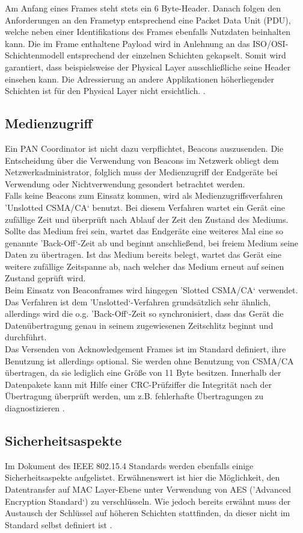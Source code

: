 Am Anfang eines Frames steht stets ein 6 Byte-Header. Danach folgen den Anforderungen an den Frametyp entsprechend eine Packet Data Unit (PDU), welche neben einer Identifikations des Frames ebenfalls Nutzdaten beinhalten kann. Die im Frame enthaltene Payload wird in Anlehnung an das ISO/OSI-Schichtenmodell entsprechend der einzelnen Schichten gekapselt. Somit wird garantiert, dass beispielsweise der Physical Layer ausschließliche seine Header einsehen kann. Die Adressierung an andere Applikationen höherliegender Schichten ist für den Physical Layer nicht ersichtlich.
\cite{d:hesse} \cite{d:ieee}.

\subsection{Medienzugriff}\label{ss:Medienzugriff}

Ein PAN Coordinator ist nicht dazu verpflichtet, Beacons auszusenden. Die Entscheidung über die Verwendung von Beacons im Netzwerk obliegt dem Netzwerkadministrator, folglich muss der Medienzugriff der Endgeräte bei Verwendung oder Nichtverwendung gesondert betrachtet werden. \\
Falls keine Beacons zum Einsatz kommen, wird als Medienzugriffsverfahren 'Unslotted CSMA/CA‘ benutzt. Bei diesem Verfahren wartet ein Gerät eine zufällige Zeit und überprüft nach Ablauf der Zeit den Zustand des Mediums. Sollte das Medium frei sein, wartet das Endgeräte eine weiteres Mal eine so genannte 'Back-Off‘-Zeit ab und beginnt anschließend, bei freiem Medium seine Daten zu übertragen. Ist das Medium bereits belegt, wartet das Gerät eine weitere zufällige Zeitspanne ab, nach welcher das Medium erneut auf seinen Zustand geprüft wird.\\
Beim Einsatz von Beaconframes wird hingegen 'Slotted CSMA/CA‘ verwendet. Das Verfahren ist dem 'Unslotted‘-Verfahren grundsätzlich sehr ähnlich, allerdings wird die o.g. 'Back-Off‘-Zeit so synchronisiert, dass das Gerät die Datenübertragung genau in seinem zugewiesenen Zeitschlitz beginnt und durchführt. \\
Das Versenden von Acknowledgement Frames ist im Standard definiert, ihre Benutzung ist allerdings optional. Sie werden ohne Benutzung von CSMA/CA übertragen, da sie lediglich eine Größe von 11 Byte besitzen. Innerhalb der Datenpakete kann mit Hilfe einer CRC-Prüfziffer die Integrität nach der Übertragung überprüft werden, um z.B. fehlerhafte Übertragungen zu diagnostizieren \cite{d:hesse} \cite{d:ieee}.

\subsection{Sicherheitsaspekte}\label{ss:Sicherheitsaspekte}

Im Dokument des IEEE 802.15.4 Standards werden ebenfalls einige Sicherheitsaspekte aufgelistet. Erwähnenswert ist hier die Möglichkeit, den Datentransfer auf MAC Layer-Ebene unter Verwendung von AES ('Advanced Encryption Standard‘) zu verschlüsseln. Wie jedoch bereits erwähnt muss der Austausch der Schlüssel auf höheren Schichten stattfinden, da dieser nicht im Standard selbst definiert ist \cite{d:hesse} \cite{d:ieee}.